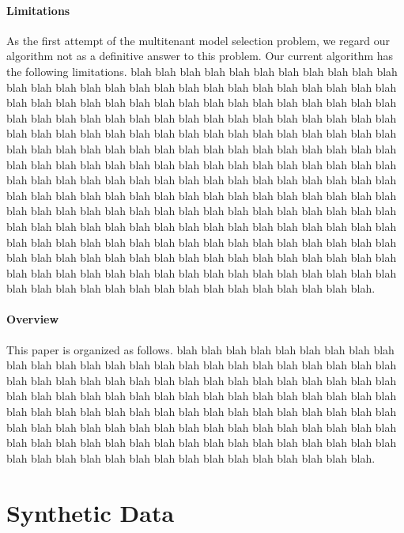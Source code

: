 \paragraph*{Limitations} As the first attempt
of the multitenant model selection problem, 
we regard our algorithm not as a definitive answer
to this problem. Our current algorithm has
the following limitations. blah blah blah blah blah
blah blah blah blah blah blah blah blah blah blah
blah blah blah blah blah blah blah blah blah blah
blah blah blah blah blah blah blah blah blah blah
blah blah blah blah blah blah blah blah blah blah
blah blah blah blah blah blah blah blah blah blah
blah blah blah blah blah blah blah blah blah blah
blah blah blah blah blah blah blah blah blah blah
blah blah blah blah blah blah blah blah blah blah
blah blah blah blah blah blah blah blah blah blah
blah blah blah blah blah blah blah blah blah blah
blah blah blah blah blah blah blah blah blah blah
blah blah blah blah blah blah blah blah blah blah
blah blah blah blah blah blah blah blah blah blah
blah blah blah blah blah blah blah blah blah blah
blah blah blah blah blah blah blah blah blah blah
blah blah blah blah blah blah blah blah blah blah
blah blah blah blah blah blah blah blah blah blah
blah blah blah blah blah blah blah blah blah blah
blah blah blah blah blah blah blah blah blah blah
blah blah blah blah blah blah blah blah blah blah
blah blah blah blah blah blah blah blah blah blah
blah blah blah blah blah blah blah blah blah
blah blah blah blah blah blah blah blah blah blah.

\paragraph*{Overview} This paper is organized as follows.
blah blah blah blah blah blah blah blah blah blah
blah blah blah blah blah blah blah blah blah blah
blah blah blah blah blah blah blah blah blah blah
blah blah blah blah blah blah blah blah blah blah
blah blah blah blah blah blah blah blah blah blah
blah blah blah blah blah blah blah blah blah blah
blah blah blah blah blah blah blah blah blah blah
blah blah blah blah blah blah blah blah blah blah
blah blah blah blah blah blah blah blah blah blah
blah blah blah blah blah blah blah blah blah blah
blah blah blah blah blah blah blah blah blah blah
blah blah blah blah blah blah blah blah blah blah.


\section{Synthetic Data}\label{sec:appendix:synthetic}

